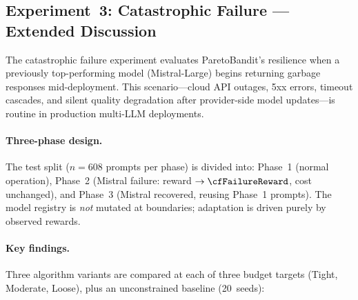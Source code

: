 
\subsection{Experiment~3: Catastrophic Failure --- Extended Discussion}
\label{appendix:catastrophic_failure_extended}

The catastrophic failure experiment evaluates ParetoBandit's resilience
when a previously top-performing model (Mistral-Large) begins returning
garbage responses mid-deployment.  This scenario---cloud API outages,
5xx errors, timeout cascades, and silent quality degradation after
provider-side model updates---is routine in production multi-LLM
deployments.

\paragraph{Three-phase design.}
The test split ($n{=}608$ prompts per phase) is divided into:
Phase~1 (normal operation), Phase~2 (Mistral failure: reward
$\to\cfFailureReward$, cost unchanged), and Phase~3 (Mistral recovered,
reusing Phase~1 prompts).  The model registry is \emph{not} mutated
at boundaries; adaptation is driven purely by observed rewards.

\paragraph{Key findings.}
Three algorithm variants are compared at each of three budget targets
(Tight, Moderate, Loose), plus an unconstrained baseline (20~seeds):

